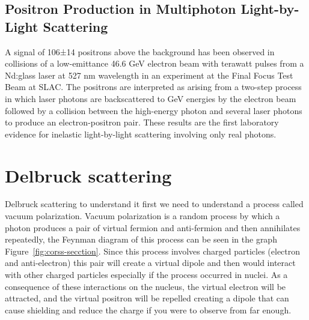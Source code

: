 \documentclass{paper}
\begin{document}
\subsection{Positron Production in Multiphoton Light-by-Light Scattering}%
\label{subsec:positron}

\label{subsec:light-light-low-energy}
A signal of 106±14 positrons above the background has been observed in collisions of a low-emittance 46.6 GeV electron beam with terawatt pulses from a Nd:glass laser at 527 nm wavelength in an experiment at the Final Focus Test Beam at SLAC. The positrons are interpreted as arising from a two-step process in which laser photons are backscattered to GeV energies by the electron beam followed by a collision between the high-energy photon and several laser photons to produce an electron-positron pair. These results are the first laboratory evidence for inelastic light-by-light scattering involving only real photons.\cite{physrevlett}



\section{Delbruck scattering}

Delbruck scattering to understand it first we need to understand a process called vacuum polarization.
Vacuum polarization is a random process by which a photon produces a pair of virtual fermion and anti-fermion and then annihilates repeatedly, the Feynman diagram of this process can be seen in the graph Figure~\ref{fig:corss-secction}.
Since this process involves charged particles (electron and anti-electron) this pair will create a virtual dipole and then would interact with other charged particles especially if the process occurred in nuclei. As a consequence of these interactions on the nucleus, the virtual electron will be attracted, and the virtual positron will be repelled creating a dipole that can cause shielding and reduce the charge if you were to observe from far enough.
\end{document}

